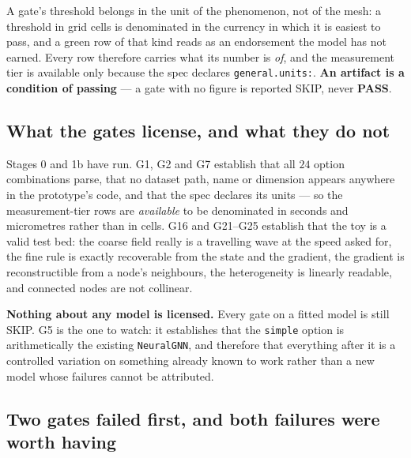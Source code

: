 \documentclass[11pt,a4paper]{article}
\newcommand{\code}[1]{\texttt{\small #1}}
\newcommand{\gpass}[1]{\textcolor{cpass}{\textbf{#1}}}
\newcommand{\gskip}[1]{\textcolor{cskip}{#1}}
\begin{document}
A gate's threshold belongs in the unit of the phenomenon, not of the mesh: a threshold in grid
cells is denominated in the currency in which it is easiest to pass, and a green row of that kind
reads as an endorsement the model has not earned. Every row therefore carries what its number is
\emph{of}, and the measurement tier is available only because the spec declares
\code{general.units:}. \textbf{An artifact is a condition of passing} --- a gate with no figure is
reported \gskip{SKIP}, never \gpass{PASS}.

\smallskip
\tblGates

\subsection{What the gates license, and what they do not}

Stages 0 and 1b have run. G1, G2 and G7 establish that all $24$ option combinations parse, that no
dataset path, name or dimension appears anywhere in the prototype's code, and that the spec
declares its units --- so the measurement-tier rows are \emph{available} to be denominated in
seconds and micrometres rather than in cells. G16 and G21--G25 establish that the toy is a valid
test bed: the coarse field really is a travelling wave at the speed asked for, the fine rule is
exactly recoverable from the state and the gradient, the gradient is reconstructible from a node's
neighbours, the heterogeneity is linearly readable, and connected nodes are not collinear.

\textbf{Nothing about any model is licensed.} Every gate on a fitted model is still \gskip{SKIP}.
G5 is the one to watch: it establishes that the \code{simple} option is arithmetically the existing
\code{NeuralGNN}, and therefore that everything after it is a controlled variation on something
already known to work rather than a new model whose failures cannot be attributed.

\subsection{Two gates failed first, and both failures were worth having}
\end{document}
